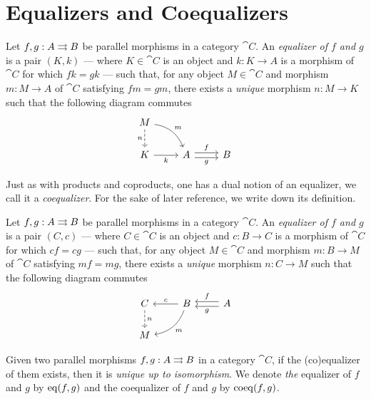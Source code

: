 \section{Equalizers and Coequalizers}

\begin{definition}[Equalizer]
\label{def:equalizer}
Let \(f, g: A \rightrightarrows B\) be parallel morphisms in a category \(\cat C\). An
\emph{equalizer of \(f\) and \(g\)} is a pair \((K, k)\) --- where
\(K \in \cat C\) is an object and \(k: K \to A\) is a morphism of \(\cat C\) for
which \(f k = g k\) --- such that, for any object \(M \in \cat C\) and morphism
\(m: M \to A\) of \(\cat C\) satisfying \(f m = g m\), there exists a
\emph{unique} morphism \(n: M \to K\) such that the following diagram commutes
\[
\begin{tikzcd}
M \ar[d, dashed, "n"'] \ar[rd, bend left, "m"] & &
\\
K \ar[r, "k"'] &A \ar[r, shift left, "f"] \ar[r, shift right, "g"'] &B
\end{tikzcd}
\]
\end{definition}

Just as with products and coproducts, one has a dual notion of an equalizer, we
call it a \emph{coequalizer}. For the sake of later reference, we write down its
definition.

\begin{definition}[Coequalizer]
\label{def:coequalizer}
Let \(f, g: A \rightrightarrows B\) be parallel morphisms in a category \(\cat C\). An
\emph{equalizer of \(f\) and \(g\)} is a pair \((C, c)\) --- where
\(C \in \cat C\) is an object and \(c: B \to C\) is a morphism of \(\cat C\) for
which \(c f = c g\) --- such that, for any object \(M \in \cat C\) and morphism
\(m: B \to M\) of \(\cat C\) satisfying \(m f = m g\), there exists a
\emph{unique} morphism \(n: C \to M\) such that the following diagram commutes
\[
\begin{tikzcd}
C \ar[d, dashed, "n"]
& B \ar[l, "c"'] \ar[ld, "m", bend left]
& A \ar[l, shift left, "g"] \ar[l, shift right, "f"']
\\
M& &
\end{tikzcd}
\]

\end{definition}

\begin{proposition}[Uniqueness]
\label{prop:(co)equalizer-unique-up-to-iso}
Given two parallel morphisms \(f, g: A \rightrightarrows B\) in a category \(\cat C\), if
the (co)equalizer of them exists, then it is \emph{unique up to isomorphism}. We
denote \emph{the} equalizer of \(f\) and \(g\) by \(\operatorname{eq}(f, g)\) and the
coequalizer of \(f\) and \(g\) by \(\operatorname{coeq}(f, g)\).
\end{proposition}

